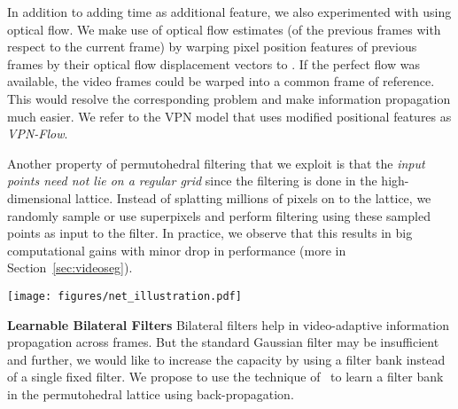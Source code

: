 \documentclass[10pt,twocolumn,letterpaper]{article}
\newcommand{\mycaption}[2]{\caption{\small \textbf{#1.}~#2}}
\begin{document}
In addition to adding time  as additional feature, we also experimented with using optical flow.
We make use of optical flow estimates (of the previous frames with respect to the current frame)
by warping pixel position features  of previous frames by their optical flow displacement vectors
 to .
If the perfect flow was available, the video frames could be warped into a common frame of reference. This would resolve the corresponding problem and make information propagation much easier.
We refer to the VPN model that uses modified positional features  as \emph{VPN-Flow}.

Another property of permutohedral filtering that we exploit
is that the \emph{input points need not lie on a regular grid} since the filtering
is done in the high-dimensional lattice. Instead of splatting millions of pixels on to the
lattice, we randomly sample or use superpixels and perform filtering using these sampled
points as input to the filter. In practice, we observe that this results in big computational
gains with minor drop in performance (more in Section~\ref{sec:videoseg}).

\begin{figure*}[th!]
\begin{center}
\centerline{\texttt{[image: figures/net\_illustration.pdf]}}
  \mycaption{Computation Flow of Video Propagation Network} {Bilateral networks (BNN) consist of a series of
  bilateral filterings interleaved with ReLU non-linearities. The filtered information from BNN is then passed
  into a
  spatial network (CNN) which refines the features with convolution layers interleaved with ReLU
  non-linearities, resulting in the prediction for the current frame.}
  \label{fig:net_illustration}
  \vspace{-1.0cm}
\end{center}
\end{figure*}


{\bf Learnable Bilateral Filters} Bilateral filters help in video-adaptive information propagation across
frames.
But the standard Gaussian filter may be insufficient and further, we would like to increase the capacity by using a filter bank instead of a single fixed filter.
We propose to use the technique of~\cite{jampani_2016_cvpr} to learn a filter bank in the permutohedral lattice using back-propagation.
\end{document}

